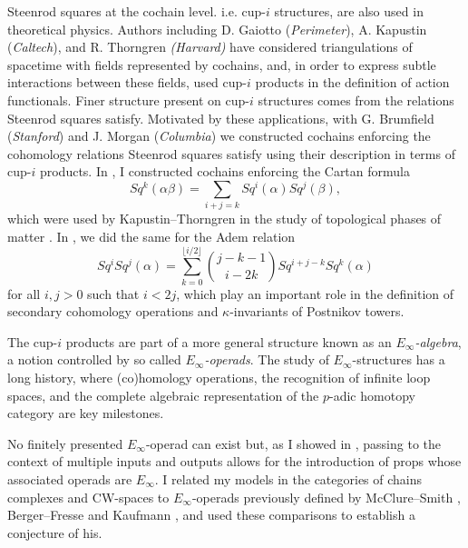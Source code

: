 Steenrod squares at the cochain level. i.e. cup-$i$ structures, are also used in theoretical physics. Authors including D. Gaiotto (\textit{Perimeter}), A. Kapustin (\textit{Caltech}), and R. Thorngren \textit{(Harvard)} have considered triangulations of spacetime with fields represented by cochains, and, in order to express subtle interactions between these fields, used cup-$i$ products in the definition of action functionals.
Finer structure present on cup-$i$ structures comes from the relations Steenrod squares satisfy.
Motivated by these applications, with G. Brumfield (\textit{Stanford}) and J. Morgan (\textit{Columbia}) we constructed cochains enforcing the cohomology relations Steenrod squares satisfy using their description in terms of cup-$i$ products.
In \cite{medina2020cartan}, I constructed cochains enforcing the Cartan formula
\begin{equation*}
Sq^k(\alpha \beta) = \sum_{i+j=k} Sq^i(\alpha) Sq^j(\beta),
\end{equation*}
which were used by Kapustin--Thorngren in the study of topological phases of matter \cite{kapustin2017fermionic}.
In \cite{medina2021adem}, we did the same for the Adem relation
\begin{equation*}
Sq^i Sq^j(\alpha) = \sum_{k=0}^{\lfloor i/2 \rfloor} \binom{j-k-1}{i-2k} Sq^{i+j-k} Sq^k(\alpha)
\end{equation*}
for all $i,j > 0$ such that $i < 2j$, which play an important role in the definition of secondary cohomology operations and $\kappa$-invariants of Postnikov towers.

The cup-$i$ products are part of a more general structure known as an \textit{$E_\infty$-algebra}, a notion controlled by so called \textit{$E_\infty$-operads}.
The study of $E_\infty$-structures has a long history, where (co)homology operations, the recognition of infinite loop spaces, and the complete algebraic representation of the $p$-adic homotopy category are key milestones.

No finitely presented $E_\infty$-operad can exist but, as I showed in \cite{medina2020prop1, medina2018prop2}, passing to the context of multiple inputs and outputs allows for the introduction of props whose associated operads are $E_\infty$.
I related my models in the categories of chains complexes and CW-spaces to $E_\infty$-operads previously defined by McClure--Smith \cite{mcclure2003multivariable}, Berger--Fresse \cite{berger2004combinatorial} and Kaufmann \cite{kaufmann2009dimension}, and used these comparisons to establish a conjecture of his.

